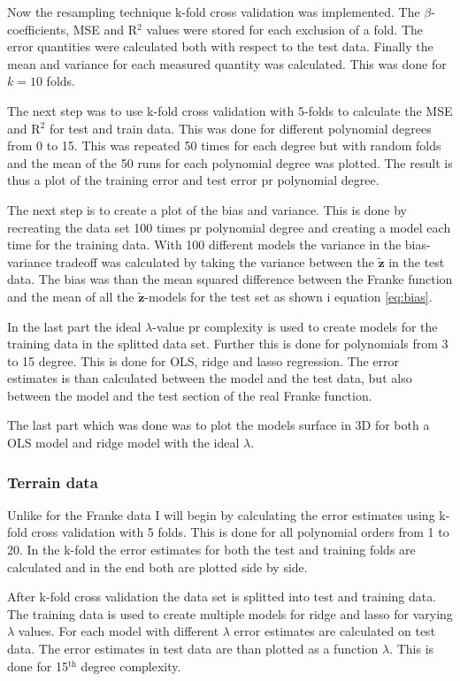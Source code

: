 \documentclass[uio,jmp,amsmath,amssymb,reprint,nofootinbib]{revtex4-1}
\numberwithin{equation}{section}
\begin{document}
Now the resampling technique k-fold cross validation was implemented. The \(\beta\)-coefficients, MSE and R\(^2\) values were stored for each exclusion of a fold. The error quantities were calculated both with respect to the test data. Finally the mean and variance for each measured quantity was calculated. This was done for \(k=10\) folds.

The next step was to use k-fold cross validation with 5-folds to calculate the MSE and R\(^2\) for test and train data. This was done for different polynomial degrees from 0 to 15. This was repeated 50 times for each degree but with random folds and the mean of the 50 runs for each polynomial degree was plotted. The result is thus a plot of the training error and test error pr polynomial degree.

The next step is to create a plot of the bias and variance. This is done by recreating the data set 100 times pr polynomial degree and creating a model each time for the training data. With 100 different models the variance in the bias-variance tradeoff was calculated by taking the variance between the \(\bm{\tilde{z}}\) in the test data. The bias was than the mean squared difference between the Franke function and the mean of all the \(\bm{\tilde{z}}\)-models for the test set as shown i equation \ref{eq:bias}.

In the last part the ideal \(\lambda\)-value pr complexity is used to create models for the training data in the splitted data set. Further this is done for polynomials from 3 to 15 degree. This is done for OLS, ridge and lasso regression. The error estimates is than calculated between the model and the test data, but also between the model and the test section of the real Franke function.

The last part which was done was to plot the models surface in 3D for both a OLS model and ridge model with the ideal \(\lambda\).

\subsubsection{Terrain data}

Unlike for the Franke data I will begin by calculating the error estimates using k-fold cross validation with 5 folds. This is done for all polynomial orders from 1 to 20. In the k-fold the error estimates for both the test and training folds are calculated and in the end both are plotted side by side.

After k-fold cross validation the data set is splitted into test and training data. The training data is used to create multiple models for ridge and lasso for varying \(\lambda\) values. For each model with different \(\lambda\) error estimates are calculated on test data. The error estimates in test data are than plotted as a function   \(\lambda\). This is done for 15\(^\text{th}\) degree complexity.
\end{document}
